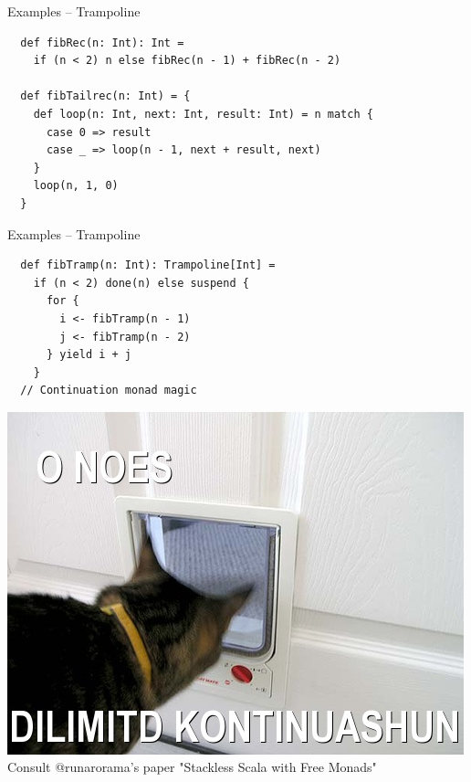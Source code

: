 \documentclass{beamer}
\begin{document}
\begin{frame}[fragile]{Examples -- Trampoline}
  \begin{verbatim}
  def fibRec(n: Int): Int =
    if (n < 2) n else fibRec(n - 1) + fibRec(n - 2)

  def fibTailrec(n: Int) = {
    def loop(n: Int, next: Int, result: Int) = n match {
      case 0 => result
      case _ => loop(n - 1, next + result, next)
    }
    loop(n, 1, 0)
  }
  \end{verbatim}
\end{frame}

\begin{frame}[fragile]{Examples -- Trampoline}
  \begin{verbatim}
  def fibTramp(n: Int): Trampoline[Int] =
    if (n < 2) done(n) else suspend {
      for {
        i <- fibTramp(n - 1)
        j <- fibTramp(n - 2)
      } yield i + j
    }
  // Continuation monad magic
  \end{verbatim}
  \includegraphics[scale=0.2]{cont}\newline
  Consult @runarorama's paper "Stackless Scala with Free Monads"
\end{frame}
\end{document}
